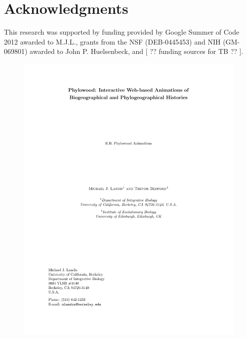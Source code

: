 \documentclass[11pt]{article}
\begin{document}
\section*{Acknowledgments}

This research was supported by funding provided by Google Summer of Code 2012 awarded to M.J.L., grants from the NSF (DEB-0445453) and NIH (GM-069801) awarded to John P. Huelsenbeck, and [ ?? funding sources for TB ?? ].



\newpage

\newpage

\begin{figure}
\begin{center}
\includegraphics[width=\textwidth]{phylowood}
\caption{
}
\end{center}
\end{figure}
\end{document}

